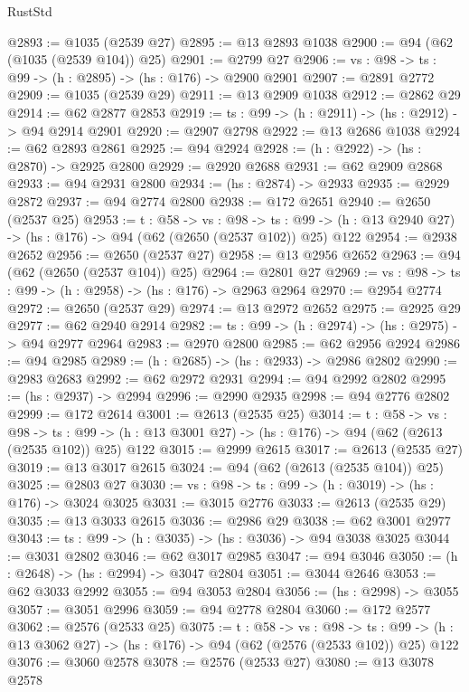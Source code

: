 \begin{lexlean}{RustStd}
\begin{coremodule}
{\begin{coremodule}
{{{{{{{{{@2893 := @1035 (@2539 @27)
@2895 := @13 @2893 @1038
@2900 := @94 (@62 (@1035 (@2539 @104)) @25)
@2901 := @2799 @27
@2906 := {vs : @98} -> {ts : @99} -> (h : @2895) -> (hs : @176) -> @2900 @2901
@2907 := @2891 @2772
@2909 := @1035 (@2539 @29)
@2911 := @13 @2909 @1038
@2912 := @2862 @29
@2914 := @62 @2877 @2853
@2919 := {ts : @99} -> (h : @2911) -> (hs : @2912) -> @94 @2914 @2901
@2920 := @2907 @2798
@2922 := @13 @2686 @1038
@2924 := @62 @2893 @2861
@2925 := @94 @2924
@2928 := (h : @2922) -> (hs : @2870) -> @2925 @2800
@2929 := @2920 @2688
@2931 := @62 @2909 @2868
@2933 := @94 @2931 @2800
@2934 := (hs : @2874) -> @2933
@2935 := @2929 @2872
@2937 := @94 @2774 @2800
@2938 := @172 @2651
@2940 := @2650 (@2537 @25)
@2953 := {t : @58} ->
  {vs : @98} ->
  {ts : @99} -> (h : @13 @2940 @27) -> (hs : @176) -> @94 (@62 (@2650 (@2537 @102)) @25) @122
@2954 := @2938 @2652
@2956 := @2650 (@2537 @27)
@2958 := @13 @2956 @2652
@2963 := @94 (@62 (@2650 (@2537 @104)) @25)
@2964 := @2801 @27
@2969 := {vs : @98} -> {ts : @99} -> (h : @2958) -> (hs : @176) -> @2963 @2964
@2970 := @2954 @2774
@2972 := @2650 (@2537 @29)
@2974 := @13 @2972 @2652
@2975 := @2925 @29
@2977 := @62 @2940 @2914
@2982 := {ts : @99} -> (h : @2974) -> (hs : @2975) -> @94 @2977 @2964
@2983 := @2970 @2800
@2985 := @62 @2956 @2924
@2986 := @94 @2985
@2989 := (h : @2685) -> (hs : @2933) -> @2986 @2802
@2990 := @2983 @2683
@2992 := @62 @2972 @2931
@2994 := @94 @2992 @2802
@2995 := (hs : @2937) -> @2994
@2996 := @2990 @2935
@2998 := @94 @2776 @2802
@2999 := @172 @2614
@3001 := @2613 (@2535 @25)
@3014 := {t : @58} ->
  {vs : @98} ->
  {ts : @99} -> (h : @13 @3001 @27) -> (hs : @176) -> @94 (@62 (@2613 (@2535 @102)) @25) @122
@3015 := @2999 @2615
@3017 := @2613 (@2535 @27)
@3019 := @13 @3017 @2615
@3024 := @94 (@62 (@2613 (@2535 @104)) @25)
@3025 := @2803 @27
@3030 := {vs : @98} -> {ts : @99} -> (h : @3019) -> (hs : @176) -> @3024 @3025
@3031 := @3015 @2776
@3033 := @2613 (@2535 @29)
@3035 := @13 @3033 @2615
@3036 := @2986 @29
@3038 := @62 @3001 @2977
@3043 := {ts : @99} -> (h : @3035) -> (hs : @3036) -> @94 @3038 @3025
@3044 := @3031 @2802
@3046 := @62 @3017 @2985
@3047 := @94 @3046
@3050 := (h : @2648) -> (hs : @2994) -> @3047 @2804
@3051 := @3044 @2646
@3053 := @62 @3033 @2992
@3055 := @94 @3053 @2804
@3056 := (hs : @2998) -> @3055
@3057 := @3051 @2996
@3059 := @94 @2778 @2804
@3060 := @172 @2577
@3062 := @2576 (@2533 @25)
@3075 := {t : @58} ->
  {vs : @98} ->
  {ts : @99} -> (h : @13 @3062 @27) -> (hs : @176) -> @94 (@62 (@2576 (@2533 @102)) @25) @122
@3076 := @3060 @2578
@3078 := @2576 (@2533 @27)
@3080 := @13 @3078 @2578
}}}}}}}}}
\end{coremodule}}
\end{coremodule}
\end{lexlean}
